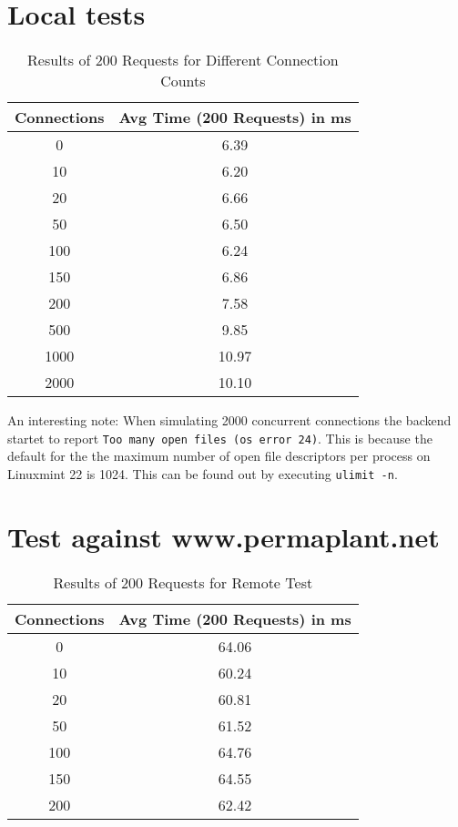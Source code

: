 \documentclass[final,draft]{vutinfth} %
\begin{document}
\section{Local tests}

\begin{table}[h!]
    \centering
    \begin{tabular}{cc}
        \toprule
        \textbf{Connections} & \textbf{Avg Time (200 Requests) in ms} \\
        \midrule
        0 & 6.39 \\
        10 & 6.20 \\
        20 & 6.66 \\
        50 & 6.50 \\
        100 & 6.24 \\
        150 & 6.86 \\
        200 & 7.58 \\
        500 & 9.85 \\
        1000 & 10.97 \\
        2000 & 10.10 \\
        \bottomrule
    \end{tabular}
    \caption{Results of 200 Requests for Different Connection Counts}
\end{table}

An interesting note: When simulating 2000 concurrent connections the backend startet to report \texttt{Too many open files (os error 24)}.
This is because the default for the the maximum number of open file descriptors per process on Linuxmint 22 is 1024.
This can be found out by executing \texttt{ulimit -n}.


\section{Test against www.permaplant.net}

\begin{table}[h!]
    \centering
    \begin{tabular}{cc}
        \toprule
        \textbf{Connections} & \textbf{Avg Time (200 Requests) in ms} \\
        \midrule
        0 & 64.06 \\
        10 & 60.24 \\
        20 & 60.81 \\
        50 & 61.52 \\
        100 & 64.76 \\
        150 & 64.55 \\
        200 & 62.42 \\
        \bottomrule
    \end{tabular}
    \caption{Results of 200 Requests for Remote Test}
\end{table}
\end{document}
